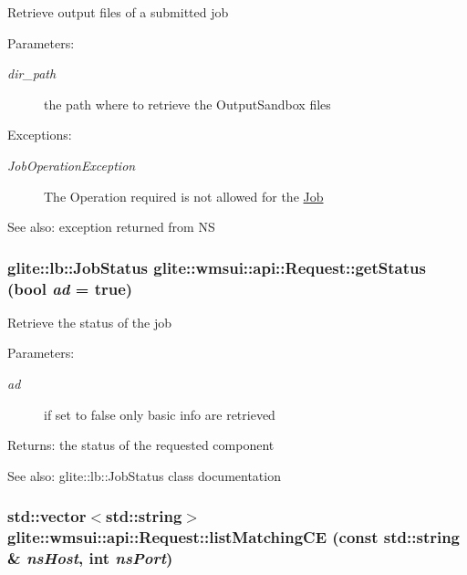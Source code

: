 Retrieve output files of a submitted job \begin{Desc}
\item[Parameters:]
\begin{description}
\item[{\em dir\_\-path}]the path where to retrieve the Output\-Sandbox files \end{description}
\end{Desc}
\begin{Desc}
\item[Exceptions:]
\begin{description}
\item[{\em Job\-Operation\-Exception}]The Operation required is not allowed for the \hyperlink{classglite_1_1wmsui_1_1api_1_1Job}{Job} \end{description}
\end{Desc}
\begin{Desc}
\item[See also:]exception returned from NS \end{Desc}
\hypertarget{classglite_1_1wmsui_1_1api_1_1Request_z13_0}{
\subsubsection[getStatus]{\setlength{\rightskip}{0pt plus 5cm}glite::lb::Job\-Status glite::wmsui::api::Request::get\-Status (bool {\em ad} = true)}}
\label{classglite_1_1wmsui_1_1api_1_1Request_z13_0}


Retrieve the status of the job \begin{Desc}
\item[Parameters:]
\begin{description}
\item[{\em ad}]if set to false only basic info are retrieved \end{description}
\end{Desc}
\begin{Desc}
\item[Returns:]the status of the requested component \end{Desc}
\begin{Desc}
\item[See also:]glite::lb::Job\-Status class documentation \end{Desc}
\hypertarget{classglite_1_1wmsui_1_1api_1_1Request_z13_3}{
\subsubsection[listMatchingCE]{\setlength{\rightskip}{0pt plus 5cm}std::vector$<$std::string$>$ glite::wmsui::api::Request::list\-Matching\-CE (const std::string \& {\em ns\-Host}, int {\em ns\-Port})}}
\label{classglite_1_1wmsui_1_1api_1_1Request_z13_3}


